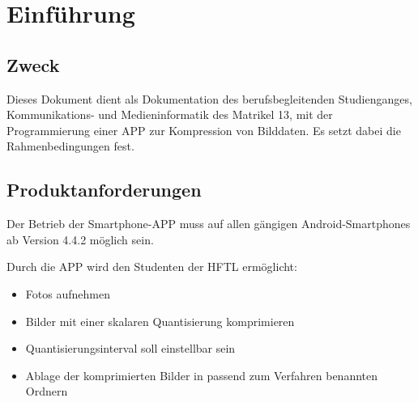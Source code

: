 
\section{Einführung}

\subsection{\textbf{Zweck}}
Dieses Dokument dient als Dokumentation des berufsbegleitenden Studienganges, Kommunikations- und Medieninformatik des Matrikel 13, mit der Programmierung einer APP zur Kompression von Bilddaten. Es setzt dabei die Rahmenbedingungen fest.


\subsection{\textbf{Produktanforderungen}}

Der Betrieb der Smartphone-APP muss auf allen gängigen Android-Smartphones ab Version 4.4.2 möglich sein.

Durch die APP wird den Studenten der HFTL ermöglicht: 

\begin{itemize}
      \item Fotos aufnehmen
      \item Bilder mit einer skalaren Quantisierung komprimieren
      \item Quantisierungsinterval soll einstellbar sein 
      \item Ablage der komprimierten Bilder in passend zum Verfahren benannten Ordnern
\end{itemize}
   



